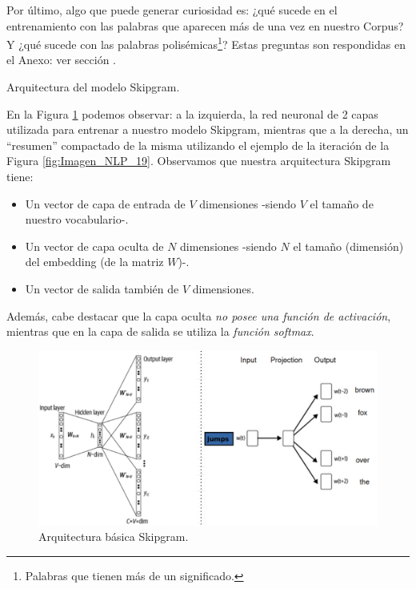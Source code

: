\documentclass[12pt,a4paper]{article}
\makeatletter
\renewcommand\paragraph{\@startsection{paragraph}{4}{\z@}
            {-2.5ex\@plus -1ex \@minus -.25ex}
            {1.25ex \@plus .25ex}
            {\normalfont\normalsize\bfseries}}
\makeatother
\begin{document}
\begin{sloppypar}
Por último, algo que puede generar curiosidad es: ¿qué sucede en el entrenamiento con las palabras que aparecen más de una vez en nuestro Corpus? Y ¿qué sucede con las palabras polisémicas\footnote{Palabras que tienen más de un significado.}? Estas preguntas son respondidas en el Anexo: ver sección \textit{}.

\cleardoublepage

\paragraph{Arquitectura del modelo Skipgram.}\label{skipgram}

En la Figura \ref{fig:Imagen_NLP_22} podemos observar: a la izquierda, la red neuronal de 2 capas utilizada para entrenar a nuestro modelo Skipgram, mientras que a la derecha, un “resumen” compactado de la misma utilizando el ejemplo de la iteración de la Figura \ref{fig:Imagen_NLP_19}.  Observamos que nuestra arquitectura Skipgram tiene:
\begin{itemize}
\item Un vector de capa de entrada de $V$ dimensiones -siendo $V$ el tamaño de nuestro vocabulario-.
\item Un vector de capa oculta de $N$ dimensiones -siendo $N$ el tamaño (dimensión) del embedding (de la matriz $W$)-. 
\item Un vector de salida también de $V$ dimensiones. 
\end{itemize}

Además, cabe destacar que la capa oculta \textit{no posee una función de activación}, mientras que en la capa de salida se utiliza la \textit{función softmax}. 

\begin{figure}[H]    
 \centering
 \includegraphics[width=1\textwidth]{images/NLP/22.png}
 \caption{Arquitectura básica Skipgram\cite{NLP_26}.}
 \label{fig:Imagen_NLP_22}
\end{figure}


\end{sloppypar}
\end{document}
